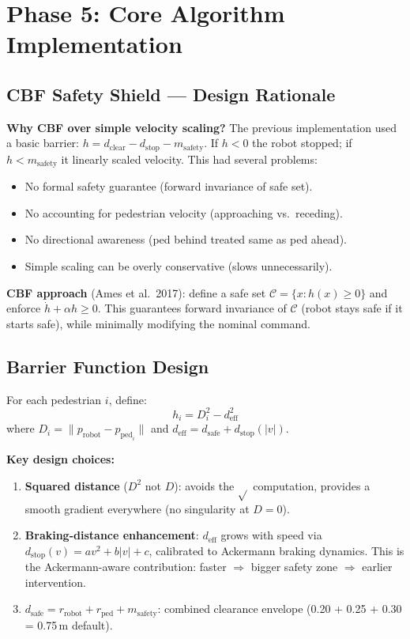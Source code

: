 \documentclass[11pt]{article}
\begin{document}
\newpage
\section{Phase 5: Core Algorithm Implementation}

\subsection{CBF Safety Shield --- Design Rationale}

\textbf{Why CBF over simple velocity scaling?}
The previous implementation used a basic barrier: $h = d_{\text{clear}} - d_{\text{stop}} - m_{\text{safety}}$.
If $h < 0$ the robot stopped; if $h < m_{\text{safety}}$ it linearly scaled velocity.
This had several problems:
\begin{itemize}
  \item No formal safety guarantee (forward invariance of safe set).
  \item No accounting for pedestrian velocity (approaching vs.\ receding).
  \item No directional awareness (ped behind treated same as ped ahead).
  \item Simple scaling can be overly conservative (slows unnecessarily).
\end{itemize}

\textbf{CBF approach} (Ames et al.\ 2017): define a safe set $\mathcal{C} = \{x : h(x) \geq 0\}$ and enforce $\dot{h} + \alpha h \geq 0$. This guarantees forward invariance of $\mathcal{C}$ (robot stays safe if it starts safe), while minimally modifying the nominal command.

\subsection{Barrier Function Design}

For each pedestrian $i$, define:
\[
  h_i = D_i^2 - d_{\text{eff}}^2
\]
where $D_i = \|p_{\text{robot}} - p_{\text{ped}_i}\|$ and $d_{\text{eff}} = d_{\text{safe}} + d_{\text{stop}}(|v|)$.

\textbf{Key design choices:}
\begin{enumerate}
  \item \textbf{Squared distance} ($D^2$ not $D$): avoids the $\sqrt{}$ computation, provides a smooth gradient everywhere (no singularity at $D=0$).
  \item \textbf{Braking-distance enhancement}: $d_{\text{eff}}$ grows with speed via $d_{\text{stop}}(v) = a v^2 + b|v| + c$, calibrated to Ackermann braking dynamics. This is the Ackermann-aware contribution: faster $\Rightarrow$ bigger safety zone $\Rightarrow$ earlier intervention.
  \item \textbf{$d_{\text{safe}} = r_{\text{robot}} + r_{\text{ped}} + m_{\text{safety}}$}: combined clearance envelope (0.20 + 0.25 + 0.30 = 0.75\,m default).
\end{enumerate}
\end{document}
